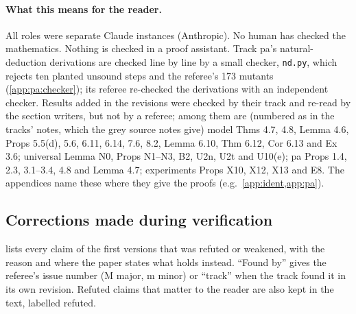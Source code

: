 \paragraph{What this means for the reader.} All roles were separate Claude instances (Anthropic). No human has checked the mathematics. Nothing is checked in a proof assistant. Track pa's natural-deduction derivations are checked line by line by a small checker, \texttt{nd.py}, which rejects ten planted unsound steps and the referee's 173 mutants (\cref{app:pa:checker}); its referee re-checked the derivations with an independent checker. Results added in the revisions were checked by their track and re-read by the section writers, but not by a referee; among them are (numbered as in the tracks' notes, which the grey source notes give) model Thms 4.7, 4.8, Lemma 4.6, Props 5.5(d), 5.6, 6.11, 6.14, 7.6, 8.2, Lemma 6.10, Thm 6.12, Cor 6.13 and Ex 3.6; universal Lemma N0, Props N1--N3, B2, U2n, U2t and U10(e); pa Props 1.4, 2.3, 3.1--3.4, 4.8 and Lemma 4.7; experiments Props X10, X12, X13 and E8. The appendices name these where they give the proofs (e.g.\ \cref{app:ident,app:pa}).

\subsection{Corrections made during verification}\label{app:ver:corrections}

 lists every claim of the first versions that was refuted or weakened, with the reason and where the paper states what holds instead. ``Found by'' gives the referee's issue number (M major, m minor) or ``track'' when the track found it in its own revision. Refuted claims that matter to the reader are also kept in the text, labelled refuted.

